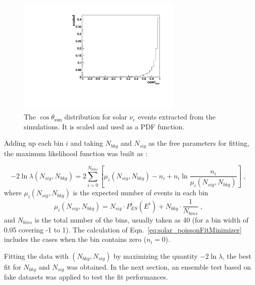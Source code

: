 \begin{figure}[!htb]
	\centering
	\includegraphics[width=8cm]{solarPDF.pdf}
	\caption[The $\cos\theta_\mathrm{sun}$ distribution of solar $\nu_e$ used as a PDF function.]{The $\cos\theta_\mathrm{sun}$ distribution for solar $\nu_e$ events extracted from the simulations. It is scaled and used as a PDF function.\label{solarPDF}}
\end{figure}

Adding up each bin $i$ and taking $N_{bkg}$ and $N_{sig}$ as the free parameters for fitting, the maximum likelihood function was built as \cite{pdg2020}:

\begin{equation}\label{eq:solar_poissonFitMinimizer}
-2\ln\mathcal \lambda(N_{sig},N_{bkg})
=2\sum_{i=0}^{N_{bins}}[\mu_i(N_{sig},N_{bkg})-n_i+n_i\ln\frac{n_i}{\mu_i(N_{sig},N_{bkg})}]\; ,
\end{equation}
where $\mu_i(N_{sig},N_{bkg})$ is the expected number of events in each bin
\begin{equation*}
\mu_i(N_{sig},N_{bkg})=N_{sig}\cdot P^i_{ES}(E^i)+N_{bkg}\cdot\frac{1}{N_{bins}}\; ,
\end{equation*}
and $N_{bins}$ is the total number of the bins, usually taken as 40 (for a bin width of 0.05 covering -1 to 1). The calculation of Eqn.~\ref{eq:solar_poissonFitMinimizer} includes the cases when the bin contains zero ($n_i=0$).

Fitting the data with $(N_{bkg},N_{sig})$ by maximizing the quantity $-2\ln\mathcal\lambda$, the best fit for $N_{bkg}$ and $N_{sig}$ was obtained. In the next section, an ensemble test based on fake datasets was applied to test the fit performances.
%
%
